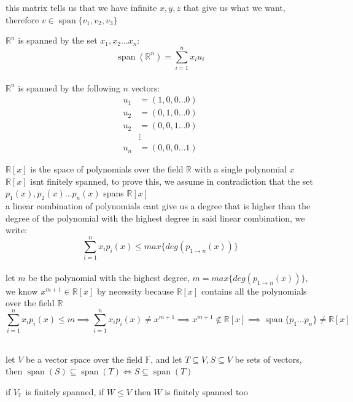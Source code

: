 \documentclass[a4paper,12pt]{article}
\DeclareMathOperator{\spn}{span}
\begin{document}
\begin{definition}
\begin{my_example}
this matrix tells us that we have infinite \(x,y,z\) that give us what we want, therefore \(v \in \spn\{v_1,v_2,v_3\}\)\\
\end{my_example}
\begin{my_example}
\(\mathbb{R} ^n\) is spanned by the set \(x_1,x_2\ldots x_n\):\\
\[
  \spn(\mathbb{R}^n) = \sum_{i=1}^{n} x_iu_i
\]\\
\(\mathbb{R}^n\) is spanned by the following \(n\) vectors:\\
\begin{align*}
  u_1 &= (1,0,0\ldots 0)\\
  u_2 &= (0,1,0\ldots 0)\\
  u_2 &= (0,0,1\ldots 0)\\
  &\vdots\\
  u_n &= (0,0,0\ldots 1)
\end{align*}
\end{my_example}
\begin{my_example}
\(\mathbb{R}[x]\) is the space of polynomials over the field \(\mathbb{R}\) with a single polynomial \(x\)\\
\(\mathbb{R}[x]\) isnt finitely spanned, to prove this, we assume in contradiction that the set \(p_1(x),p_2(x)\ldots p_n(x)\) spans \(\mathbb{R}[x]\)\\
a linear combination of polynomials cant give us a degree that is higher than the degree of the polynomial with the highest degree in said linear combination, we write:\\
\[
  \sum_{i=1}^n x_ip_i(x) \leq max\{deg(p_{1 \rightarrow n}(x))\}
\]\\
let \(m\) be the polynomial with the highest degree, \(m = max\{deg(p_{1 \rightarrow n}(x))\}\), we know \(x^{m+1} \in \mathbb{R}[x]\) by necessity because \(\mathbb{R}[x]\) contains all the polynomials over the field \(\mathbb{R}\)\\
\[
  \sum_{i=1}^n x_ip_i(x) \leq m \implies \sum_{i=1}^{n} x_ip_i(x) \neq x^{m+1} \implies x^{m+1} \not \in \mathbb{R}[x] \implies \spn\{p_1\ldots p_n\} \neq \mathbb{R}[x]
\]\\
\end{my_example}
\begin{lemma}
let \(V\) be a vector space over the field \(\mathbb{F}\), and let \(T \subseteq V, S \subseteq V\) be sets of vectors, then \(\spn(S) \subseteq \spn(T) \iff S \subseteq \spn(T)\)\\
\end{lemma}
\begin{lemma}
if \(V_\mathbb{F}\) is finitely spanned, if \(W \leq V\) then \(W\) is finitely spanned too\\
\end{lemma}
\end{definition}
\end{document}
